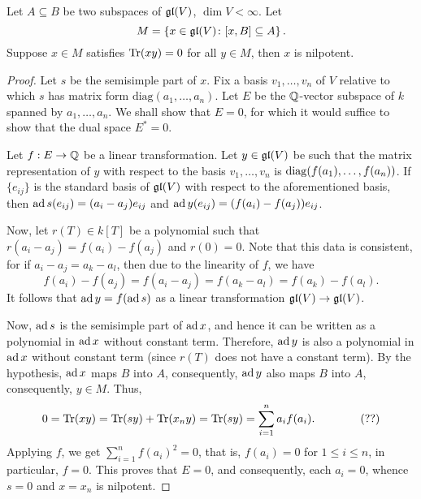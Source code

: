 \begin{lemma}
    Let $A\subseteq B$ be two subspaces of $\mathfrak{gl}(V)$, $\dim V < \infty$. Let 
    \begin{equation*}
    M = \left\{x\in\mathfrak{gl}(V)\colon [x, B]\subseteq A\right\}. 
    \end{equation*}
    Suppose $x\in M$ satisfies $\operatorname{Tr}(xy) = 0$ for all $y\in M$, then $x$ is nilpotent.
\end{lemma}
\begin{proof}
    Let $s$ be the semisimple part of $x$. Fix a basis $v_1,\dots, v_n$ of $V$ relative to which $s$ has matrix form $\mathrm{diag}(a_1,\dots, a_n)$. Let $E$ be the $\mathbb{Q}$-vector subspace of $k$ spanned by $a_1,\dots,a_n$. We shall show that $E = 0$, for which it would suffice to show that the dual space $E^\ast = 0$. 

    Let $f: E\to\mathbb{Q}$ be a linear transformation. Let $y\in\mathfrak{gl}(V)$ be such that the matrix representation of $y$ with respect to the basis $v_1,\dots,v_n$ is $\operatorname{diag}(f(a_1),\dots,f(a_n))$. If $\{e_{ij}\}$ is the standard basis of $\mathfrak{gl}(V)$ with respect to the aforementioned basis, then $\operatorname{ad} s(e_{ij}) = (a_i - a_j)e_{ij}$ and $\operatorname{ad} y(e_{ij}) = (f(a_i) - f(a_j))e_{ij}$.

    Now, let $r(T)\in k[T]$ be a polynomial such that $r(a_i - a_j) = f(a_i) - f(a_j)$ and $r(0) = 0$. Note that this data is consistent, for if $a_i - a_j = a_k - a_l$, then due to the linearity of $f$, we have 
    \begin{equation*}
        f(a_i) - f(a_j) = f(a_i - a_j) = f(a_k - a_l) = f(a_k) - f(a_l).
    \end{equation*}
    It follows that $\operatorname{ad} y = f(\operatorname{ad} s)$ as a linear transformation $\mathfrak{gl}(V)\to\mathfrak{gl}(V)$.

    Now, $\operatorname{ad} s$ is the semisimple part of $\operatorname{ad} x$, and hence it can be written as a polynomial in $\operatorname{ad} x$ without constant term. Therefore, $\operatorname{ad} y$ is also a polynomial in $\operatorname{ad} x$ without constant term (since $r(T)$ does not have a constant term). By the hypothesis, $\operatorname{ad} x$ maps $B$ into $A$, consequently, $\operatorname{ad} y$ also maps $B$ into $A$, consequently, $y\in M$. Thus, 
    \begin{equation*}
        0 = \Tr(xy) = \Tr(sy) + \Tr(x_ny) = \Tr(sy) = \sum_{i = 1}^n a_i f(a_i).\qquad\qquad (??) %
    \end{equation*}
    Applying $f$, we get $\sum_{i = 1}^n f(a_i)^2 = 0$, that is, $f(a_i) = 0$ for $1\le i\le n$, in particular, $f = 0$. This proves that $E = 0$, and consequently, each $a_i = 0$, whence $s = 0$ and $x = x_n$ is nilpotent.
\end{proof}

